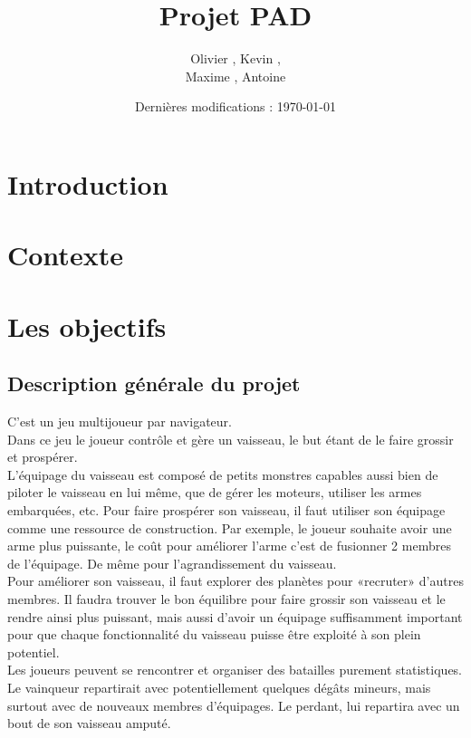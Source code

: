 \documentclass[a4paper,11pt]{report}
\title{Projet PAD}
\author{Olivier \bsc{Boissard}, Kevin \bsc{Boulala},\\
Maxime \bsc{Dubois}, Antoine \bsc{Lavier}}
\date{Dernières modifications : \today}
\begin{document}
\maketitle
\tableofcontents

\chapter{Introduction}


\chapter{Contexte}


\chapter{Les objectifs}
    \section{Description générale du projet}
    C'est un jeu multijoueur par navigateur.\\
    Dans ce jeu le joueur contrôle et gère un vaisseau, le but étant de le faire grossir et prospérer.\\
    L’équipage du vaisseau est composé de petits monstres capables aussi bien de piloter le vaisseau en lui même, que de gérer les moteurs, utiliser les armes embarquées, etc. Pour faire prospérer son vaisseau, il faut utiliser son équipage comme une ressource de construction. Par exemple, le joueur souhaite avoir une arme plus puissante, le coût pour améliorer l’arme c’est de fusionner 2 membres de l’équipage. De même pour l’agrandissement du vaisseau.\\
    Pour améliorer son vaisseau, il faut explorer des planètes pour «recruter» d’autres membres. Il faudra trouver le bon équilibre pour faire grossir son vaisseau et le rendre ainsi plus puissant, mais aussi d’avoir un équipage suffisamment important pour que chaque fonctionnalité du vaisseau puisse être exploité à son plein potentiel.\\
    Les joueurs peuvent se rencontrer et organiser des batailles purement statistiques. Le vainqueur repartirait avec potentiellement quelques dégâts mineurs, mais surtout avec de nouveaux membres d’équipages. Le perdant, lui repartira avec un bout de son vaisseau amputé.\\
\end{document}

